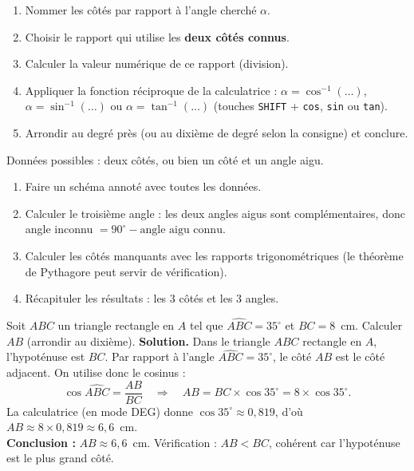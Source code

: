 \documentclass[11pt]{article}
\begin{document}
\begin{methode}
\begin{enumerate}
    \item Nommer les côtés par rapport à l'angle cherché $\alpha$.
    \item Choisir le rapport qui utilise les \textbf{deux côtés connus}.
    \item Calculer la valeur numérique de ce rapport (division).
    \item Appliquer la fonction réciproque de la calculatrice : $\alpha = \cos^{-1}(\ldots)$, $\alpha = \sin^{-1}(\ldots)$ ou $\alpha = \tan^{-1}(\ldots)$ (touches \texttt{SHIFT} + \texttt{cos}, \texttt{sin} ou \texttt{tan}).
    \item Arrondir au degré près (ou au dixième de degré selon la consigne) et conclure.
\end{enumerate}
\end{methode}

\begin{methode}
Données possibles : deux côtés, ou bien un côté et un angle aigu.
\begin{enumerate}
    \item Faire un schéma annoté avec toutes les données.
    \item Calculer le troisième angle : les deux angles aigus sont complémentaires, donc angle inconnu $= 90^\circ - \text{angle aigu connu}$.
    \item Calculer les côtés manquants avec les rapports trigonométriques (le théorème de Pythagore peut servir de vérification).
    \item Récapituler les résultats : les 3 côtés et les 3 angles.
\end{enumerate}
\end{methode}

\begin{exoresolu}
Soit $ABC$ un triangle rectangle en $A$ tel que $\widehat{ABC} = 35^\circ$ et $BC = 8$~cm. Calculer $AB$ (arrondir au dixième).
\tcblower
\textbf{Solution.} Dans le triangle $ABC$ rectangle en $A$, l'hypoténuse est $BC$. Par rapport à l'angle $\widehat{ABC} = 35^\circ$, le côté $AB$ est le côté adjacent. On utilise donc le cosinus :
\[
\cos \widehat{ABC} = \frac{AB}{BC}
\quad\Longrightarrow\quad
AB = BC \times \cos 35^\circ = 8 \times \cos 35^\circ.
\]
La calculatrice (en mode DEG) donne $\cos 35^\circ \approx 0,819$, d'où $AB \approx 8 \times 0,819 \approx 6,6$~cm.\\
\textbf{Conclusion :} $AB \approx 6,6$~cm. Vérification : $AB < BC$, cohérent car l'hypoténuse est le plus grand côté.
\end{exoresolu}
\end{document}
